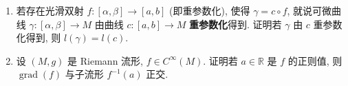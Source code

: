 \begin{RiemannExercise}
\begin{enumerate}[label=(\arabic*),ref=\arabic*,leftmargin=*]
\begin{enumerate}[label=(\alph*),leftmargin=*]
\item $S^3\cong SU(2)$ 上的标准度量左不变;
\item $\mathcal{M}_{n\times n}\cong\mathbb{R}^{n^2}$ 的 Euclidean 度量在 $O(n)$ 上诱导的度量左不变.
\end{enumerate}
\item\label{ex:length-independent-of-parameterization} 若存在光滑双射 $f:[\alpha,\beta]\to[a,b]$ (即重参数化), 使得 $\gamma=c\circ f$, 就说可微曲线 $\gamma:[\alpha,\beta]\to M$ 由曲线 $c:[a,b]\to M$ \textbf{重参数化}得到. 证明若 $\gamma$ 由 $c$ 重参数化得到, 则 $l(\gamma)=l(c)$.
\item\label{ex:gradient-normal-to-regular-level-set} 设 $(M,g)$ 是 Riemann 流形, $f\in C^\infty(M)$. 证明若 $a\in\mathbb{R}$ 是 $f$ 的正则值, 则 $\operatorname{grad}(f)$ 与子流形 $f^{-1}(a)$ 正交.
\end{enumerate}
\end{RiemannExercise}
